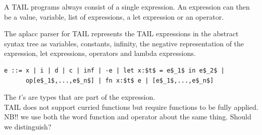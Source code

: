 \documentclass[11pt]{article}
\begin{document}
A TAIL programs always consist of a single expression. An expression can then be a value, variable, 
list of expressions, a let expression or an operator.

The aplacc parser for TAIL represents the TAIL expressions in the abstract syntax tree as variables, constants, infinity, the negative representation of 
the expression, let expressions, operators and lambda expressions. 
\begin{lstlisting}[numbers=none,frame=none]
e ::= x | i | d | c | inf | -e | let x:$t$ = e$_1$ in e$_2$ |
      op[e$_1$,...,e$_n$] | fn x:$t$ e | [e$_1$,...,e$_n$]
\end{lstlisting}

The $t$'s are types that are part of the expression. \\

TAIL does not support curried functions but require functions to be fully applied.\\

NB!! we use both the word function and operator about the same thing. Should we distinguish?










 
\end{document}
